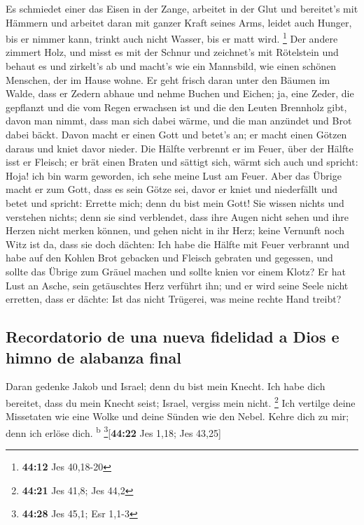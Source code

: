  Es schmiedet einer das Eisen in der Zange, arbeitet in
der Glut und bereitet's mit Hämmern und arbeitet daran mit ganzer Kraft
seines Arms, leidet auch Hunger, bis er nimmer kann, trinkt auch nicht
Wasser, bis er matt wird. \footnote{\textbf{44:12} Jes 40,18-20}
 Der andere zimmert Holz, und misst es mit der Schnur und
zeichnet's mit Rötelstein und behaut es und zirkelt's ab und macht's wie
ein Mannsbild, wie einen schönen Menschen, der im Hause wohne.
 Er geht frisch daran unter den Bäumen im Walde, dass er
Zedern abhaue und nehme Buchen und Eichen; ja, eine Zeder, die gepflanzt
und die vom Regen erwachsen ist  und die den Leuten
Brennholz gibt, davon man nimmt, dass man sich dabei wärme, und die man
anzündet und Brot dabei bäckt. Davon macht er einen Gott und betet's an;
er macht einen Götzen daraus und kniet davor nieder.  Die
Hälfte verbrennt er im Feuer, über der Hälfte isst er Fleisch; er brät
einen Braten und sättigt sich, wärmt sich auch und spricht: Hoja! ich
bin warm geworden, ich sehe meine Lust am Feuer.  Aber
das Übrige macht er zum Gott, dass es sein Götze sei, davor er kniet und
niederfällt und betet und spricht: Errette mich; denn du bist mein Gott!
 Sie wissen nichts und verstehen nichts; denn sie sind
verblendet, dass ihre Augen nicht sehen und ihre Herzen nicht merken
können,  und gehen nicht in ihr Herz; keine Vernunft noch
Witz ist da, dass sie doch dächten: Ich habe die Hälfte mit Feuer
verbrannt und habe auf den Kohlen Brot gebacken und Fleisch gebraten und
gegessen, und sollte das Übrige zum Gräuel machen und sollte knien vor
einem Klotz?  Er hat Lust an Asche, sein getäuschtes Herz
verführt ihn; und er wird seine Seele nicht erretten, dass er dächte:
Ist das nicht Trügerei, was meine rechte Hand treibt?

\hypertarget{recordatorio-de-una-nueva-fidelidad-a-dios-e-himno-de-alabanza-final}{%
\subsection{Recordatorio de una nueva fidelidad a Dios e himno de
alabanza
final}\label{recordatorio-de-una-nueva-fidelidad-a-dios-e-himno-de-alabanza-final}}

 Daran gedenke Jakob und Israel; denn du bist mein
Knecht. Ich habe dich bereitet, dass du mein Knecht seist; Israel,
vergiss mein nicht. \footnote{\textbf{44:21} Jes 41,8; Jes 44,2}
 Ich vertilge deine Missetaten wie eine Wolke und deine
Sünden wie den Nebel. Kehre dich zu mir; denn ich erlöse dich.
\textsuperscript{b} \footnote{\textbf{44:28} Jes 45,1; Esr 1,1-3}{[}\textbf{44:22}
Jes 1,18; Jes 43,25{]}

